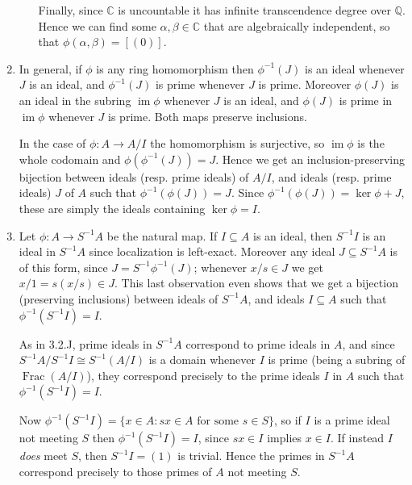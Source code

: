 \documentclass{report}
\newcommand{\Q}{\mathbb{Q}}
\newcommand{\C}{\mathbb{C}}
\DeclareMathOperator{\im}{im}
\DeclareMathOperator{\Frac}{Frac}
\begin{document}
\begin{enumerate}[label=\textbf{3.2.\Alph*.}]
\begin{enumerate}[label=(\alph*)]
		            Finally, since $\C$ is uncountable it has infinite
		            transcendence degree over $\Q$. Hence we can find some
		            $\alpha,\beta\in\C$ that are algebraically independent, so
		            that $\phi(\alpha,\beta)=[(0)]$.
	      \end{enumerate}

	\item In general, if $\phi$ is any ring homomorphism then $\phi^{-1}(J)$
	      is an ideal whenever $J$ is an ideal, and $\phi^{-1}(J)$ is prime
	      whenever $J$ is prime. Moreover $\phi(J)$ is an ideal in the subring
	      $\im\phi$ whenever $J$ is an ideal, and $\phi(J)$ is prime in
	      $\im\phi$ whenever $J$ is prime. Both maps preserve inclusions.

	      In the case of $\phi:A\to A/I$ the homomorphism is surjective, so
	      $\im\phi$ is the whole codomain and $\phi(\phi^{-1}(J))=J$. Hence we
	      get an inclusion-preserving bijection between ideals (resp. prime
	      ideals) of $A/I$, and ideals (resp. prime ideals) $J$ of $A$ such that
	      $\phi^{-1}(\phi(J))=J$. Since $\phi^{-1}(\phi(J))=\ker\phi+J$,
	      these are simply the ideals containing $\ker\phi=I$.

	\item Let $\phi:A\to S^{-1}A$ be the natural map. If $I\subseteq A$ is an
	      ideal, then $S^{-1}I$ is an ideal in $S^{-1}A$ since localization is
	      left-exact. Moreover any ideal $J\subseteq S^{-1}A$ is of this form,
	      since $J=S^{-1}\phi^{-1}(J)$; whenever $x/s\in J$ we get
	      $x/1=s(x/s)\in J$. This last observation even shows that we get a
	      bijection (preserving inclusions) between ideals of $S^{-1}A$, and
	      ideals $I\subseteq A$ such that $\phi^{-1}(S^{-1}I)=I$.

	      As in 3.2.J, prime ideals in $S^{-1}A$ correspond to prime ideals in
	      $A$, and since $S^{-1}A/S^{-1}I\cong S^{-1}(A/I)$ is a domain whenever
	      $I$ is prime (being a subring of $\Frac(A/I)$), they correspond
	      precisely to the prime ideals $I$ in $A$ such that
	      $\phi^{-1}(S^{-1}I)=I$.

	      Now $\phi^{-1}(S^{-1}I)=\{x\in A:\text{$sx\in A$ for some $s\in S$}\}$,
	      so if $I$ is a prime ideal not meeting $S$ then $\phi^{-1}(S^{-1}I)=I$,
	      since $sx\in I$ implies $x\in I$. If instead $I$ \emph{does} meet $S$,
	      then $S^{-1}I=(1)$ is trivial. Hence the primes in $S^{-1}A$
	      correspond precisely to those primes of $A$ not meeting $S$.


\end{enumerate}
\end{document}
